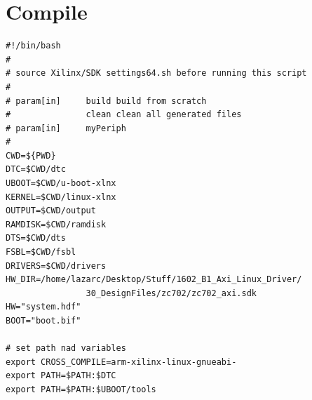 \documentclass[a4paper, 12pt, diplomski]{etf}
\begin{document}
	\chapter{Compile}\label{a:compile}

\begin{verbatim}
#!/bin/bash
#
# source Xilinx/SDK settings64.sh before running this script
#
# param[in] 	build build from scratch
# 			 	clean clean all generated files
# param[in]		myPeriph
#
CWD=${PWD}
DTC=$CWD/dtc
UBOOT=$CWD/u-boot-xlnx
KERNEL=$CWD/linux-xlnx
OUTPUT=$CWD/output
RAMDISK=$CWD/ramdisk
DTS=$CWD/dts
FSBL=$CWD/fsbl
DRIVERS=$CWD/drivers
HW_DIR=/home/lazarc/Desktop/Stuff/1602_B1_Axi_Linux_Driver/
				30_DesignFiles/zc702/zc702_axi.sdk
HW="system.hdf"
BOOT="boot.bif"

# set path nad variables
export CROSS_COMPILE=arm-xilinx-linux-gnueabi-
export PATH=$PATH:$DTC
export PATH=$PATH:$UBOOT/tools


\end{verbatim}
\end{document}
